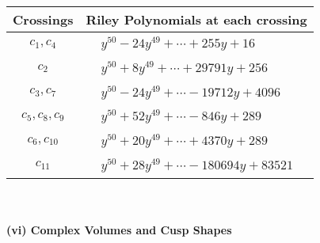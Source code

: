 \documentclass[1p]{elsarticle_modified}
\theoremstyle{definition}
\begin{document}
\begin{tabular}{m{50pt}|m{274pt}}
Crossings & \hspace{64pt}Riley Polynomials at each crossing \\
\hline $$\begin{aligned}c_{1},c_{4}\end{aligned}$$&$\begin{aligned}
&y^{50}-24 y^{49}+\cdots+255 y+16
\end{aligned}$\\
\hline $$\begin{aligned}c_{2}\end{aligned}$$&$\begin{aligned}
&y^{50}+8 y^{49}+\cdots+29791 y+256
\end{aligned}$\\
\hline $$\begin{aligned}c_{3},c_{7}\end{aligned}$$&$\begin{aligned}
&y^{50}-24 y^{49}+\cdots-19712 y+4096
\end{aligned}$\\
\hline $$\begin{aligned}c_{5},c_{8},c_{9}\end{aligned}$$&$\begin{aligned}
&y^{50}+52 y^{49}+\cdots-846 y+289
\end{aligned}$\\
\hline $$\begin{aligned}c_{6},c_{10}\end{aligned}$$&$\begin{aligned}
&y^{50}+20 y^{49}+\cdots+4370 y+289
\end{aligned}$\\
\hline $$\begin{aligned}c_{11}\end{aligned}$$&$\begin{aligned}
&y^{50}+28 y^{49}+\cdots-180694 y+83521
\end{aligned}$\\
\hline
\end{tabular}\\~\\
\newpage\flushleft \textbf{(vi) Complex Volumes and Cusp Shapes}
\end{document}
